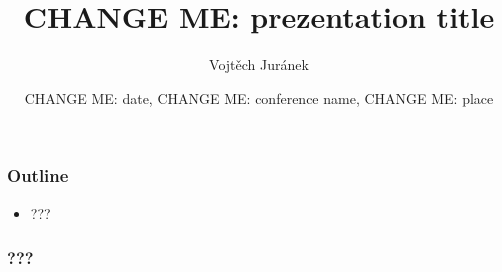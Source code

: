 \documentclass[10pt,utf8]{beamer}
\title{CHANGE ME: prezentation title}
\author{Vojtěch Juránek}
\institute[Red Hat]{JBoss - a division by Red Hat}
\date{CHANGE ME: date, CHANGE ME: conference name, CHANGE ME: place}
\begin{document}


\begin{frame}
 \titlepage
\end{frame}


\begin{frame}
  \frametitle{Outline}
  \begin{itemize}
    \item ???
  \end{itemize}
\end{frame}


\begin{frame}
  \frametitle{???}
\end{frame}



%   
% 
\end{document}
